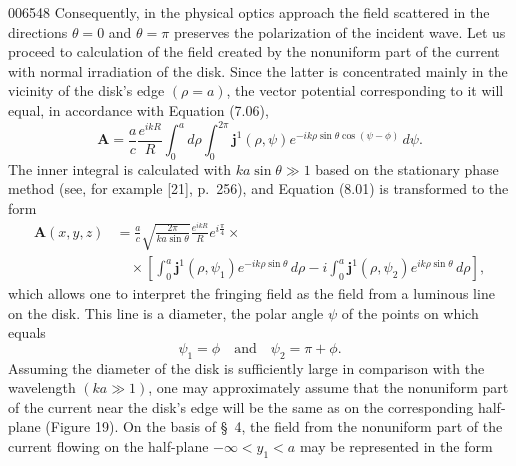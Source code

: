 \begin{scanpage}{0065}{48}
Consequently, in the physical optics approach the field scattered in the directions $\theta=0$ and $\theta=\pi$ preserves the polarization of the incident wave.
Let us proceed to calculation of the field created by the nonuniform part of the current with normal irradiation of the disk. Since the latter is concentrated mainly in the vicinity of the disk's edge $(\rho=a)$, the vector potential corresponding to it will equal, in accordance with Equation (7.06),
\[\mathbf A=\frac ac\frac{e^{ikR}}R\int_0^a d\rho\int_0^{2\pi}\mathbf j^1(\rho,\psi)e^{-ik\rho\sin\theta\cos(\psi-\phi)}\,d\psi.\tag{8.01}\]
The inner integral is calculated with $ka\sin\theta\gg1$ based on the stationary phase method (see, for example [21], p.\ 256), and Equation (8.01) is transformed to the form
\[\begin{aligned}\mathbf A(x,y,z)&=\frac ac\sqrt{\frac{2\pi}{ka\sin\theta}}\frac{e^{ikR}}R e^{i\frac\pi4}\times\\&\quad\times\left[\int_0^a\mathbf j^1(\rho,\psi_1)e^{-ik\rho\sin\theta}\,d\rho-i\int_0^a\mathbf j^1(\rho,\psi_2)e^{ik\rho\sin\theta}\,d\rho\right],\end{aligned}\tag{8.02}\]
which allows one to interpret the fringing field as the field from a luminous line on the disk. This line is a diameter, the polar angle $\psi$ of the points on which equals
\[\psi_1=\phi\quad\text{and}\quad\psi_2=\pi+\phi.\tag{8.03}\]
Assuming the diameter of the disk is sufficiently large in comparison with the wavelength $(ka\gg1)$, one may approximately assume that the nonuniform part of the current near the disk's edge will be the same as on the corresponding half-plane (Figure 19). On the basis of \S\ 4, the field from the nonuniform part of the current flowing on the half-plane $-\infty<y_1<a$ may be represented in the form
\end{scanpage}
